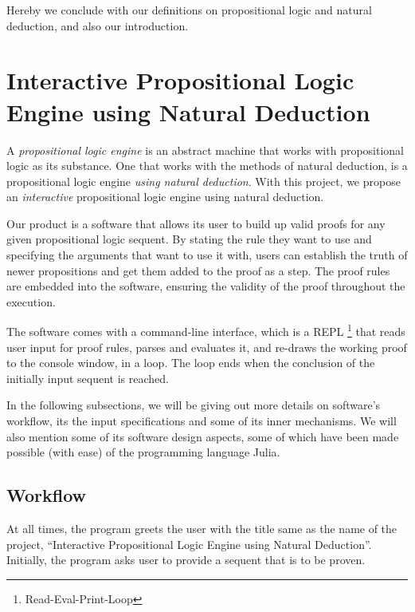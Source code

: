 \documentclass{article}
\begin{document}
Hereby we conclude with our definitions on propositional logic
and natural deduction, and also our introduction.

\section{Interactive Propositional Logic Engine using Natural Deduction}

A \textit{propositional logic engine} is an abstract machine that
works with propositional logic as its substance. One that works
with the methods of natural deduction, is a propositional logic
engine \textit{using natural deduction}. With this project,
we propose an \textit{interactive} propositional logic engine
using natural deduction.

Our product is a software that allows its user to build up valid proofs
for any given propositional logic sequent. By stating the rule they
want to use and specifying the arguments that want to use it with,
users can establish the truth of newer propositions and get them added
to the proof as a step. The proof rules are embedded into the software,
ensuring the validity of the proof throughout the execution.

The software comes with a command-line interface, which is a REPL%
\footnote{Read-Eval-Print-Loop}
that reads user input for proof rules, parses and evaluates it, and
re-draws the working proof to the console window, in a loop. The
loop ends when the conclusion of the initially input sequent is reached.

In the following subsections, we will be giving out more details on
software's workflow, its the input specifications and some of its
inner mechanisms. We will also mention some of its software design
aspects, some of which have been made possible (with ease) of the
programming language Julia.

\subsection{Workflow}

At all times, the program greets the user with the title same as the
name of the project, ``Interactive Propositional Logic Engine using
Natural Deduction''. Initially, the program asks user to provide
a sequent that is to be proven.
\end{document}
